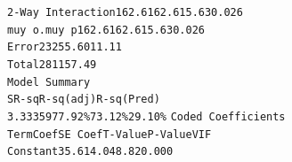 \documentclass[12pt,a4paper]{article}
\newcommand{\code}[1]{\texttt{#1}}
\begin{document}
\hspace*{0.5cm}\code{2-Way Interaction}\hspace*{0.05cm}\code{1}\hspace*{1.25cm}\code{62.61}\hspace*{1.25cm}\code{62.61}\hspace*{1.75cm}\code{5.63}\hspace*{1.4cm}\code{0.026}\\
\hspace*{1cm}\code{muy o.muy p}\hspace*{1.01cm}\code{1}\hspace*{1.25cm}\code{62.61}\hspace*{1.25cm}\code{62.61}\hspace*{1.75cm}\code{5.63}\hspace*{1.4cm}\code{0.026}\\
\code{Error}\hspace*{3.25cm}\code{23}\hspace*{1cm}\code{255.60}\hspace*{1.25cm}\code{11.11}\\
\code{Total}\hspace*{3.26cm}\code{28}\hspace*{0.755cm}\code{1157.49}\\
\newline
\code{Model Summary}\\
\hspace*{2cm}\code{S}\hspace*{1.5cm}\code{R-sq}\hspace*{1.5cm}\code{R-sq(adj)}\hspace*{1.5cm}\code{R-sq(Pred)}\\
\hspace*{0.49cm}\code{3.33359}\hspace*{1cm}\code{77.92\%}\hspace*{2.15cm}\code{73.12\%}\hspace*{2.5cm}\code{29.10\%}\newpage
\noindent
\code{Coded Coefficients}\\
\code{Term}\hspace*{3cm}\code{Coef}\hspace*{1cm}\code{SE Coef}\hspace*{1cm}\code{T-Value}\hspace*{1cm}\code{P-Value}\hspace*{1cm}\code{VIF}\\
\code{Constant}\hspace*{1.8cm}\code{35.61}\hspace*{1.7cm}\code{4.04}\hspace*{1.7cm}\code{8.82}\hspace*{1.4cm}\code{0.000}\hspace*{1.5cm}\\
\end{document}
